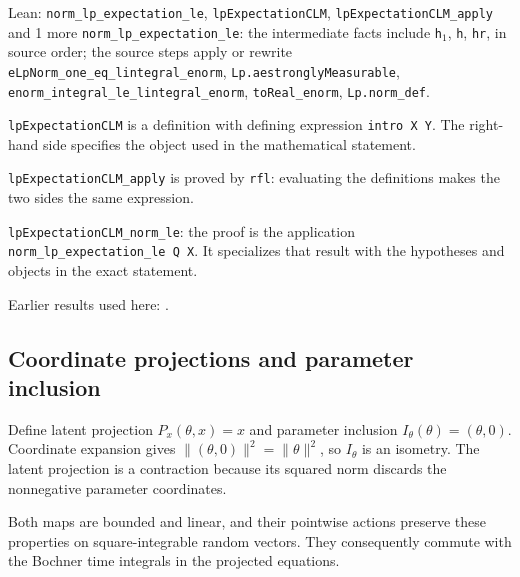 \documentclass[11pt,a4paper]{report}
\begin{document}
\begin{leanbox}{Lean: \texttt{norm\_\allowbreak{}lp\_\allowbreak{}expectation\_\allowbreak{}le}, \texttt{lpExpectationCLM}, \texttt{lpExpectationCLM\_\allowbreak{}apply} and 1 more}
\texttt{norm\_\allowbreak{}lp\_\allowbreak{}expectation\_\allowbreak{}le}: the intermediate facts include \texttt{h\ensuremath{{}_{1}}}, \texttt{h}, \texttt{hr}, in source order; the source steps apply or rewrite \texttt{e\allowbreak{}Lp\allowbreak{}Norm\_\allowbreak{}one\_\allowbreak{}eq\_\allowbreak{}lintegral\_\allowbreak{}enorm}, \texttt{Lp.\allowbreak{}aestrongly\allowbreak{}Measurable}, \texttt{enorm\_\allowbreak{}integral\_\allowbreak{}le\_\allowbreak{}lintegral\_\allowbreak{}enorm}, \texttt{to\allowbreak{}Real\_\allowbreak{}enorm}, \texttt{Lp.\allowbreak{}norm\_\allowbreak{}def}.



\texttt{lp\allowbreak{}Expectation\allowbreak{}CLM} is a definition with defining expression \texttt{intro X Y}. The right-hand side specifies the object used in the mathematical statement.



\texttt{lp\allowbreak{}Expectation\allowbreak{}CLM\_\allowbreak{}apply} is proved by \texttt{rfl}: evaluating the definitions makes the two sides the same expression.



\texttt{lp\allowbreak{}Expectation\allowbreak{}CLM\_\allowbreak{}norm\_\allowbreak{}le}: the proof is the application \texttt{norm\_\allowbreak{}lp\_\allowbreak{}expectation\_\allowbreak{}le Q X}. It specializes that result with the hypotheses and objects in the exact statement.
\end{leanbox}


Earlier results used here: \cite[Section~3.11.1]{LangevinLean2026IPLA}.
\subsection{\texorpdfstring{Coordinate projections and parameter inclusion}{Coordinate projections and parameter inclusion}}
\label{report-step-ProximalLangevin-MeanFieldProcess-lean-2}


Define latent projection \(P_x(\theta,x)=x\) and parameter inclusion \(I_\theta(\theta)=(\theta,0)\). Coordinate expansion gives \(\|(\theta,0)\|^2=\|\theta\|^2\), so \(I_\theta\) is an isometry. The latent projection is a contraction because its squared norm discards the nonnegative parameter coordinates.



Both maps are bounded and linear, and their pointwise actions preserve these properties on square-integrable random vectors. They consequently commute with the Bochner time integrals in the projected equations.
\end{document}
